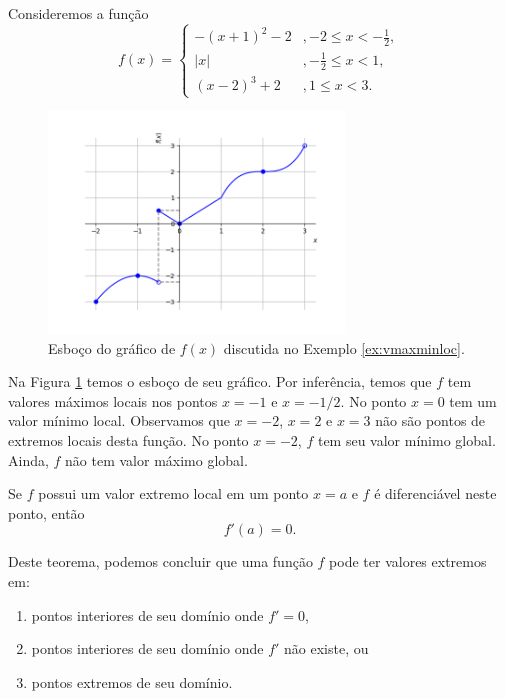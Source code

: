 \begin{ex}\label{ex:vmaxminloc}
  Consideremos a função
  \begin{equation}
    f(x) = \left\{
      \begin{array}{ll}
        -(x+1)^2-2 &, -2\leq x < -\frac{1}{2},\\
        |x| &, -\frac{1}{2} \leq x < 1,\\
        (x-2)^3+2 &, 1\leq x < 3.
      \end{array}
\right.
\end{equation}

  \begin{figure}[H]
    \centering
    \includegraphics[width=0.7\textwidth]{./cap_apderiv/dados/fig_ex_vmaxminloc/fig_f}
    \caption{Esboço do gráfico de $f(x)$ discutida no Exemplo \ref{ex:vmaxminloc}.}
    \label{fig:ex_vmaxminloc}
  \end{figure}
  
Na Figura \ref{fig:ex_vmaxminloc} temos o esboço de seu gráfico. Por inferência, temos que $f$ tem valores máximos locais nos pontos $x=-1$ e $x=-1/2$. No ponto $x=0$ tem um valor mínimo local. Observamos que $x=-2$, $x=2$ e $x=3$ não são pontos de extremos locais desta função. No ponto $x=-2$, $f$ tem seu valor mínimo global. Ainda, $f$ não tem valor máximo global.
\end{ex}

\begin{teo}
  Se $f$ possui um valor extremo local em um ponto $x=a$ e $f$ é diferenciável neste ponto, então
  \begin{equation}
    f'(a) = 0.
  \end{equation}
\end{teo}

Deste teorema, podemos concluir que uma função $f$ pode ter valores extremos em:
\begin{enumerate}
\item pontos interiores de seu domínio onde $f' = 0$,
\item pontos interiores de seu domínio onde $f'$ não existe, ou
\item pontos extremos de seu domínio.
\end{enumerate}

